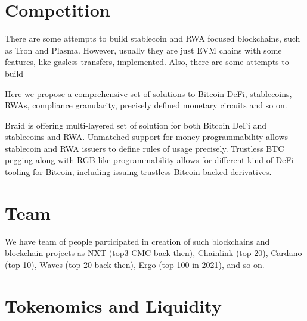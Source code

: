 \documentclass{llncs}   %
\newcommand{\authnote}[2]{\marginpar{\parbox{\marginparwidth}{\tiny %
  \textsf{#1 {\textcolor{blue}{notes: #2}}}}}%
  \textcolor{blue}{\textbf{\dag}}}
\newcommand{\authnote}[2]{
  \textsf{#1 \textcolor{blue}{: #2}}}
\newcommand{\authnote}[2]{}
\newcommand{\knote}[1]{{\authnote{\textcolor{green}{kushti notes}}{#1}}}
\newcommand{\bc}{Braid}
\begin{document}
\section{Competition}
\label{sec-competition}


There are some attempts to build stablecoin and RWA focused blockchains, such as Tron and Plasma. However, usually they are just EVM chains with some features, like gasless transfers, implemented. Also, there are some attempts to build 

Here we propose a comprehensive set of solutions to Bitcoin DeFi, stablecoins, RWAs,
compliance granularity, precisely defined monetary circuits and so on.  

\bc{} is offering multi-layered set of solution for both Bitcoin DeFi and stablecoins and RWA. Unmatched support for money programmability allows stablecoin and RWA issuers to define rules of usage precisely. Trustless BTC pegging along with RGB like programmability allows for different kind of DeFi tooling for Bitcoin, including issuing trustless Bitcoin-backed derivatives. 


\section{Team}
\label{sec-team}

We have team of people participated in creation of such blockchains and blockchain projects as NXT (top3 CMC back then), Chainlink (top 20),
 Cardano (top 10), Waves (top 20 back then), Ergo (top 100 in 2021), and so on.


\section{Tokenomics and Liquidity}
\label{sec-tokenomics}

\knote{Make the section after getting feedback on other matters}


\end{document}
